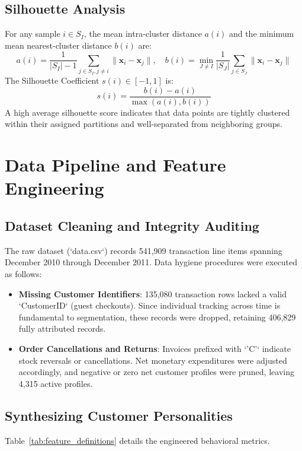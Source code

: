 \documentclass[11pt,a4paper]{article}
\begin{document}
\subsection{Silhouette Analysis}
For any sample $i \in S_I$, the mean intra-cluster distance $a(i)$ and the minimum mean nearest-cluster distance $b(i)$ are:
\begin{equation}
    a(i) = \frac{1}{|S_I| - 1}\sum_{j \in S_I, j \ne i} \|\mathbf{x}_i - \mathbf{x}_j\|, \quad b(i) = \min_{J \ne I} \frac{1}{|S_J|} \sum_{j \in S_J} \|\mathbf{x}_i - \mathbf{x}_j\|
\end{equation}
The Silhouette Coefficient $s(i) \in [-1, 1]$ is:
\begin{equation}
    s(i) = \frac{b(i) - a(i)}{\max(a(i), b(i))}
\end{equation}
A high average silhouette score indicates that data points are tightly clustered within their assigned partitions and well-separated from neighboring groups.

\section{Data Pipeline and Feature Engineering}

\subsection{Dataset Cleaning and Integrity Auditing}
The raw dataset (`data.csv`) records 541,909 transaction line items spanning December 2010 through December 2011. Data hygiene procedures were executed as follows:
\begin{itemize}[leftmargin=*]
    \item \textbf{Missing Customer Identifiers}: 135,080 transaction rows lacked a valid `CustomerID` (guest checkouts). Since individual tracking across time is fundamental to segmentation, these records were dropped, retaining 406,829 fully attributed records.
    \item \textbf{Order Cancellations and Returns}: Invoices prefixed with `'C'` indicate stock reversals or cancellations. Net monetary expenditures were adjusted accordingly, and negative or zero net customer profiles were pruned, leaving 4,315 active profiles.
\end{itemize}

\subsection{Synthesizing Customer Personalities}
Table~\ref{tab:feature_definitions} details the engineered behavioral metrics.
\end{document}
